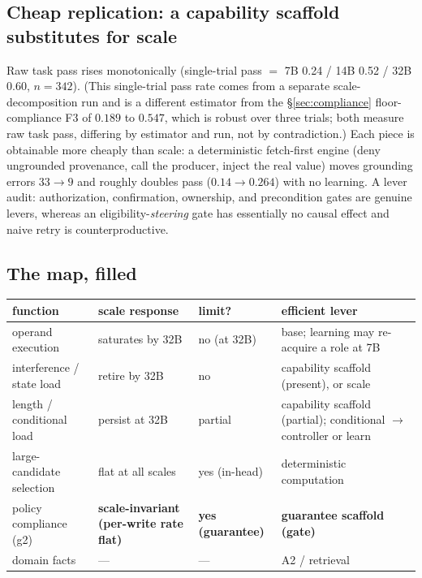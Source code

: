 \documentclass[10pt]{article}
\begin{document}
\subsection{Cheap replication: a capability scaffold substitutes for scale}
Raw task pass rises monotonically (single-trial pass $=$ 7B 0.24 / 14B 0.52 / 32B 0.60, $n{=}342$). (This single-trial pass rate comes from a separate scale-decomposition run and is a different estimator from the \S\ref{sec:compliance} floor-compliance F3 of $0.189$ to $0.547$, which is robust over three trials; both measure raw task pass, differing by estimator and run, not by contradiction.) Each piece is obtainable more cheaply than scale: a deterministic fetch-first engine (deny ungrounded provenance, call the producer, inject the real value) moves grounding errors $33\to9$ and roughly doubles pass ($0.14\to0.264$) with no learning. A lever audit: authorization, confirmation, ownership, and precondition gates are genuine levers, whereas an eligibility-\emph{steering} gate has essentially no causal effect and naive retry is counterproductive.

\subsection{The map, filled}
\begin{center}\small\begin{tabular}{p{3.1cm}p{2.8cm}p{1.4cm}p{4.4cm}}
\toprule function & scale response & limit? & efficient lever \\ \midrule
operand execution & saturates by 32B & no (at 32B) & base; learning may re-acquire a role at 7B \\
interference / state load & retire by 32B & no & capability scaffold (present), or scale \\
length / conditional load & persist at 32B & partial & capability scaffold (partial); conditional $\to$ controller or learn \\
large-candidate selection & flat at all scales & yes (in-head) & deterministic computation \\
policy compliance (g2) & \textbf{scale-invariant (per-write rate flat)} & \textbf{yes (guarantee)} & \textbf{guarantee scaffold (gate)} \\
domain facts & --- & --- & A2 / retrieval \\ \bottomrule
\end{tabular}\end{center}
\end{document}
